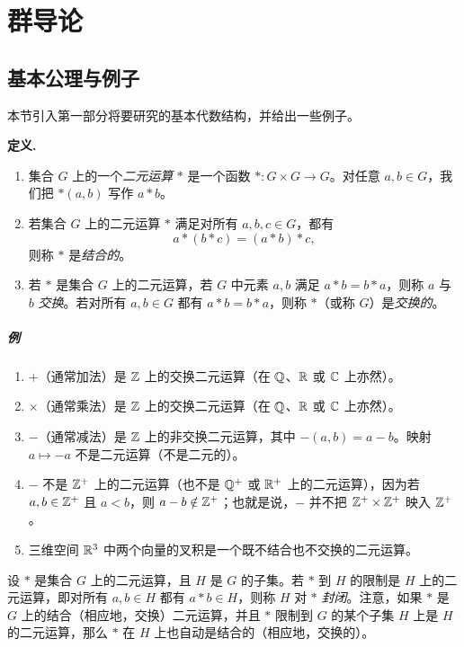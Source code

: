 
\chapter{群导论}

\section{基本公理与例子}

本节引入第一部分将要研究的基本代数结构，并给出一些例子。

\noindent\textbf{定义.}
\begin{enumerate}[label=(\arabic*)]
  \item 集合 $G$ 上的一个\emph{二元运算} $*$ 是一个函数 $*:G\times G\to G$。对任意 $a,b\in G$，我们把 $*(a,b)$ 写作 $a*b$。
  \item 若集合 $G$ 上的二元运算 $*$ 满足对所有 $a,b,c\in G$，都有
  \[
    a*(b*c)=(a*b)*c,
  \]
  则称 $*$ 是\emph{结合的}。
  \item 若 $*$ 是集合 $G$ 上的二元运算，若 $G$ 中元素 $a,b$ 满足 $a*b=b*a$，则称 $a$ 与 $b$ \emph{交换}。若对所有 $a,b\in G$ 都有 $a*b=b*a$，则称 $*$（或称 $G$）是\emph{交换的}。
\end{enumerate}

\paragraph{例}
\begin{enumerate}[label=(\arabic*)]
  \item $+$（通常加法）是 $\mathbb{Z}$ 上的交换二元运算（在 $\mathbb{Q}$、$\mathbb{R}$ 或 $\mathbb{C}$ 上亦然）。
  \item $\times$（通常乘法）是 $\mathbb{Z}$ 上的交换二元运算（在 $\mathbb{Q}$、$\mathbb{R}$ 或 $\mathbb{C}$ 上亦然）。
  \item $-$（通常减法）是 $\mathbb{Z}$ 上的非交换二元运算，其中 $-(a,b)=a-b$。映射 $a\mapsto -a$ 不是二元运算（不是二元的）。
  \item $-$ 不是 $\mathbb{Z}^+$ 上的二元运算（也不是 $\mathbb{Q}^+$ 或 $\mathbb{R}^+$ 上的二元运算），因为若 $a,b\in\mathbb{Z}^+$ 且 $a<b$，则 $a-b\notin\mathbb{Z}^+$；也就是说，$-$ 并不把 $\mathbb{Z}^+\times\mathbb{Z}^+$ 映入 $\mathbb{Z}^+$。
  \item 三维空间 $\mathbb{R}^3$ 中两个向量的叉积是一个既不结合也不交换的二元运算。
\end{enumerate}

设 $*$ 是集合 $G$ 上的二元运算，且 $H$ 是 $G$ 的子集。若 $*$ 到 $H$ 的限制是 $H$ 上的二元运算，即对所有 $a,b\in H$ 都有 $a*b\in H$，则称 $H$ 对 $*$ \emph{封闭}。注意，如果 $*$ 是 $G$ 上的结合（相应地，交换）二元运算，并且 $*$ 限制到 $G$ 的某个子集 $H$ 上是 $H$ 的二元运算，那么 $*$ 在 $H$ 上也自动是结合的（相应地，交换的）。

